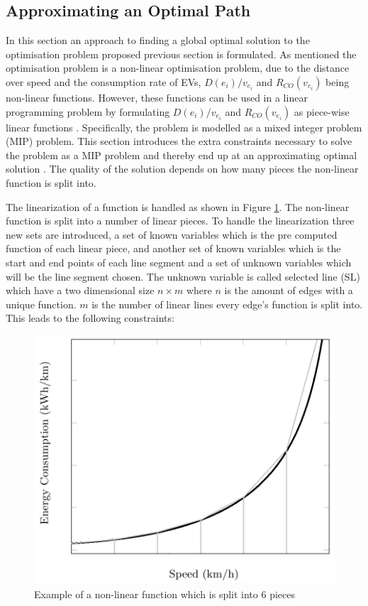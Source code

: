 
\subsection{Approximating an Optimal Path}\label{sec:LP}
In this section an approach to finding a global optimal solution to the optimisation problem proposed previous section is formulated. As mentioned the optimisation problem is a non-linear optimisation problem, due to the distance over speed and the consumption rate of EVs, \( D(e_i)/v_{e_i} \) and $R_{CO}(v_{e_i})$ being non-linear functions. However, these functions can be used in a linear programming problem by formulating \( D(e_i)/v_{e_i} \) and $R_{CO}(v_{e_i})$ as piece-wise linear functions \cite{ahuja1995capacity}. Specifically, the problem is modelled as a mixed integer problem (MIP) problem. This section introduces the extra constraints necessary to solve the problem as a MIP problem and thereby end up at an approximating optimal solution \cite{piecewiseglpk}. The quality of the solution depends on how many pieces the non-linear function is split into.

The linearization of a function is handled as shown in Figure \ref{fig:linearization_example}. The non-linear function is split into a number of linear pieces. To handle the linearization three new sets are introduced, a set of known variables which is the pre computed function of each linear piece, and another set of known variables which is the start and end points of each line segment and a set of unknown variables which will be the line segment chosen. The unknown variable is called selected line (SL) which have a two dimensional size $n \times m$ where $n$ is the amount of edges with a unique function. $m$ is the number of linear lines every edge's function is split into. This leads to the following constraints:  

\begin{figure}[h!]
\centering
\includegraphics[scale=0.33]{images/linearization_example}
\caption{Example of a non-linear function which is split into 6 pieces}
\label{fig:linearization_example}
\end{figure}

